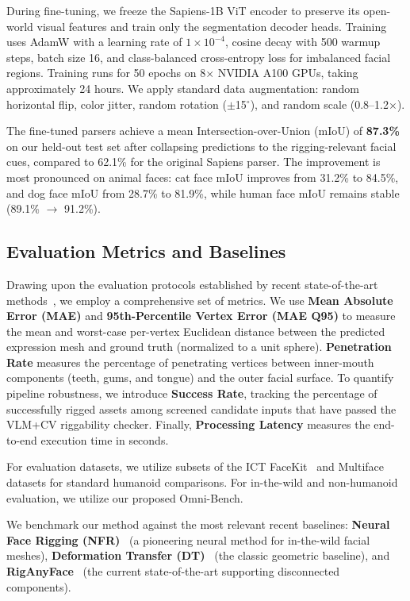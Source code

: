 \documentclass[acmtog,anonymous,review]{acmart}
\begin{document}
During fine-tuning, we freeze the Sapiens-1B ViT encoder to preserve its open-world visual features and train only the segmentation decoder heads. Training uses AdamW with a learning rate of $1 \times 10^{-4}$, cosine decay with 500 warmup steps, batch size 16, and class-balanced cross-entropy loss for imbalanced facial regions. Training runs for 50 epochs on 8$\times$ NVIDIA A100 GPUs, taking approximately 24 hours. We apply standard data augmentation: random horizontal flip, color jitter, random rotation ($\pm$15$^\circ$), and random scale (0.8--1.2$\times$).

The fine-tuned parsers achieve a mean Intersection-over-Union (mIoU) of \textbf{87.3\%} on our held-out test set after collapsing predictions to the rigging-relevant facial cues, compared to 62.1\% for the original Sapiens parser. The improvement is most pronounced on animal faces: cat face mIoU improves from 31.2\% to 84.5\%, and dog face mIoU from 28.7\% to 81.9\%, while human face mIoU remains stable (89.1\% $\rightarrow$ 91.2\%).

\subsection{Evaluation Metrics and Baselines}
\label{subsec:metrics}

Drawing upon the evaluation protocols established by recent state-of-the-art methods~\cite{ma2025riganyface, qin2023neural, cha2025neural}, we employ a comprehensive set of metrics. We use \textbf{Mean Absolute Error (MAE)} and \textbf{95th-Percentile Vertex Error (MAE Q95)} to measure the mean and worst-case per-vertex Euclidean distance between the predicted expression mesh and ground truth (normalized to a unit sphere). \textbf{Penetration Rate} measures the percentage of penetrating vertices between inner-mouth components (teeth, gums, and tongue) and the outer facial surface. To quantify pipeline robustness, we introduce \textbf{Success Rate}, tracking the percentage of successfully rigged assets among screened candidate inputs that have passed the VLM+CV riggability checker. Finally, \textbf{Processing Latency} measures the end-to-end execution time in seconds.

For evaluation datasets, we utilize subsets of the ICT FaceKit~\cite{li2020dynamic} and Multiface~\cite{wuu2022multiface} datasets for standard humanoid comparisons. For in-the-wild and non-humanoid evaluation, we utilize our proposed Omni-Bench.

We benchmark our method against the most relevant recent baselines: \textbf{Neural Face Rigging (NFR)}~\cite{qin2023neural} (a pioneering neural method for in-the-wild facial meshes), \textbf{Deformation Transfer (DT)}~\cite{sumner2004deformation} (the classic geometric baseline), and \textbf{RigAnyFace}~\cite{ma2025riganyface} (the current state-of-the-art supporting disconnected components). 
\end{document}
